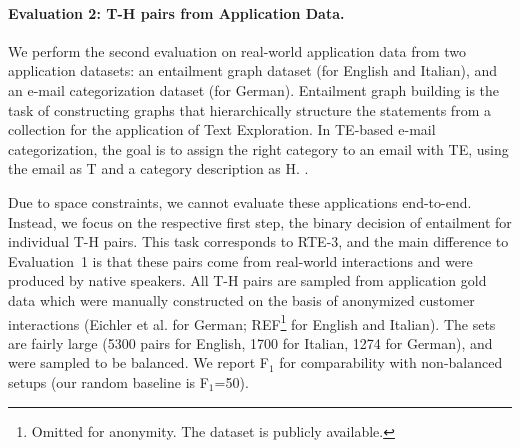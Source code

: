 \documentclass[11pt,letterpaper]{article}
\begin{document}
\paragraph{Evaluation 2: T-H pairs from Application Data.}
We perform the second evaluation on real-world application data from
two application datasets: an entailment graph dataset (for English and
Italian), and an e-mail categorization dataset (for German).
Entailment graph building is the task of constructing graphs that
hierarchically structure the statements from a collection
\cite{berant2012learning} for the application of Text Exploration.  In
TE-based e-mail categorization, the goal is to assign the right
category to an email with TE, using the email as T and a category
description as H. \cite{Eichler:2014}.

Due to space constraints, we cannot evaluate these applications
end-to-end. Instead, we focus on the respective first step, the binary
decision of entailment for individual T-H pairs. This task corresponds
to RTE-3, and the main difference to Evaluation~1 is that these pairs
come from real-world interactions and were produced by native
speakers.  All T-H pairs %
are sampled from application gold data which were manually constructed
on the basis of anonymized customer interactions (Eichler et
al.  for German; REF\footnote{Omitted for
  anonymity. The dataset is publicly available.} for English and
Italian). The sets are fairly large (5300 pairs for English, 1700 for
Italian, 1274 for German), and were sampled to be balanced. We report
F$_1$ for comparability with non-balanced setups (our random baseline
is F$_1$=50).


\end{document}
